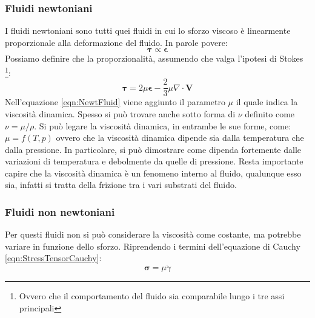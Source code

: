 \subsubsection{Fluidi newtoniani}
I fluidi newtoniani sono tutti quei fluidi in cui lo sforzo viscoso è linearmente proporzionale alla deformazione del fluido.
In parole povere:
\begin{equation}
\boldsymbol{\tau} \propto \boldsymbol{\epsilon}
\end{equation}
Possiamo definire che la proporzionalità, assumendo che valga l'ipotesi di Stokes%
\footnote{Ovvero che il comportamento del fluido sia comparabile lungo i tre assi principali}:
\begin{equation}
\boldsymbol{\tau} = 2 \mu \boldsymbol{\epsilon} - \frac{2}{3} \mu \nabla \cdot \mathbf{V}
\label{eqn:NewtFluid}
\end{equation}
Nell'equazione \eqref{eqn:NewtFluid} viene aggiunto il parametro $\mu$ il quale indica la viscosità dinamica. Spesso si può trovare anche sotto forma di $\nu$ definito come $\nu = \mu / \rho$.
Si può legare la viscosità dinamica, in entrambe le sue forme, come: $\mu = f(T,p)$ ovvero che la viscosità dinamica dipende sia dalla temperatura che dalla pressione.
In particolare, si può dimostrare come dipenda fortemente dalle variazioni di temperatura e debolmente da quelle di pressione.
Resta importante capire che la viscosità dinamica è un fenomeno interno al fluido, qualunque esso sia, infatti si tratta della frizione tra i vari substrati del fluido.

\subsubsection{Fluidi non newtoniani}
Per questi fluidi non si può considerare la viscosità come costante, ma potrebbe variare in funzione dello sforzo.
Riprendendo i termini dell'equazione di Cauchy \eqref{eqn:StressTensorCauchy}:
\begin{equation}
\boldsymbol{\sigma} = \mu \dot{\gamma}
\label{eqn:NonNewtFluid}
\end{equation} 


